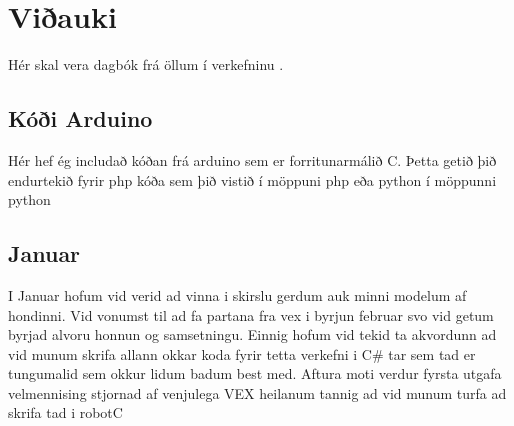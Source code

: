 \section{Viðauki}
Hér skal vera dagbók frá öllum í verkefninu .
\begingroup
\obeylines

\endgroup
\subsection{Kóði Arduino}
Hér hef ég includað kóðan frá arduino sem er forritunarmálið C. Þetta getið þið endurtekið fyrir php kóða sem þið vistið í möppuni php eða python í möppunni python
\subsection{Januar}
I Januar hofum vid verid ad vinna i skirslu gerdum auk minni modelum af hondinni. Vid vonumst til ad fa partana fra vex i byrjun februar svo vid getum byrjad alvoru honnun og samsetningu. Einnig hofum vid tekid ta akvordunn ad vid munum skrifa allann okkar koda fyrir tetta verkefni i C# tar sem tad er tungumalid sem okkur lidum badum best med. Aftura moti verdur fyrsta utgafa velmennising stjornad af venjulega VEX heilanum tannig ad vid munum turfa ad skrifa tad i robotC
\begingroup

\endgroup
